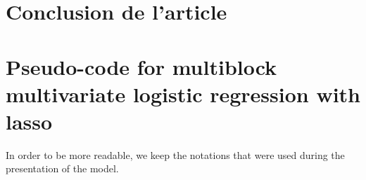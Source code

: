 \documentclass[preprint,12pt]{elsarticle}
\begin{document}
\section{Conclusion de l'article}






\newpage
  
 



\newpage

\appendix

\section{Pseudo-code for multiblock multivariate logistic regression with lasso}
\label{annexecode}

In order to be more readable, we keep the notations that were used during the presentation of the model.\\[5 pt]
\end{document}
